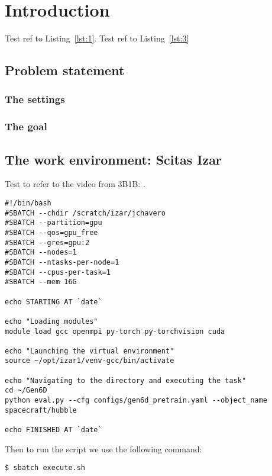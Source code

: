 
\chapter{Introduction}\label{chapter:introduction}
Test ref to Listing~\ref{lst:1}. Test ref to Listing~\ref{lst:3}
\section{Problem statement}
\subsection{The settings}
\subsection{The goal}
\section{The work environment: Scitas Izar}
Test to refer to the video from 3B1B: \cite{3b1b-1}.
\begin{lstlisting}[style=bashstyle, caption={Bash script \texttt{execute.sh} to run a machine learning model on Scitas Izar EPFL. While the overall structure remains consistent, this script is specific to Gen6D's architecture, further discussed later.}]
#!/bin/bash
#SBATCH --chdir /scratch/izar/jchavero
#SBATCH --partition=gpu
#SBATCH --qos=gpu_free
#SBATCH --gres=gpu:2
#SBATCH --nodes=1
#SBATCH --ntasks-per-node=1
#SBATCH --cpus-per-task=1
#SBATCH --mem 16G

echo STARTING AT `date`

echo "Loading modules"
module load gcc openmpi py-torch py-torchvision cuda

echo "Launching the virtual environment"
source ~/opt/izar1/venv-gcc/bin/activate

echo "Navigating to the directory and executing the task"
cd ~/Gen6D                                    
python eval.py --cfg configs/gen6d_pretrain.yaml --object_name spacecraft/hubble

echo FINISHED AT `date`
\end{lstlisting}

\noindent Then to run the script we use the following command:
\begin{lstlisting}[style=bashstyle, caption=Linux command to run the bash script.]
	$ sbatch execute.sh
\end{lstlisting}